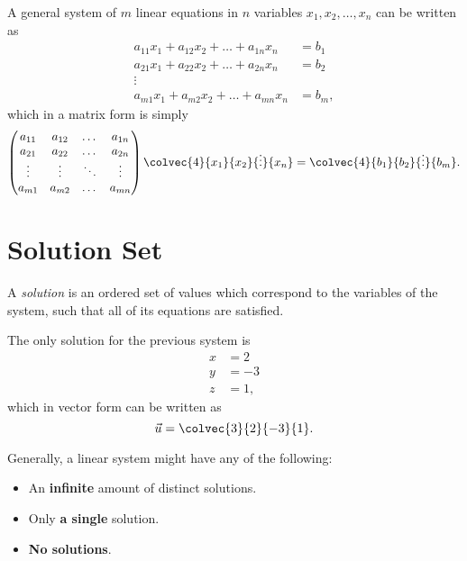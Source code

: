 A general system of $m$ linear equations in $n$ variables $x_{1}, x_{2}, \dots, x_{n}$ can be written as
\begin{align*}
  a_{11}x_{1} + a_{12}x_{2} + \dots + a_{1n}x_{n} &= b_{1}\\
  a_{21}x_{1} + a_{22}x_{2} + \dots + a_{2n}x_{n} &= b_{2}\\
  \vdots\\
  a_{m1}x_{1} + a_{m2}x_{2} + \dots + a_{mn}x_{n} &= b_{m},
\end{align*}
which in a matrix form is simply
\begin{equation*}
  \begin{pmatrix} a_{11} & a_{12} & \dots & a_{1n}\\
          a_{21} & a_{22} & \dots & a_{2n}\\
          \vdots & \vdots & \ddots & \vdots\\
          a_{m1} & a_{m2} & \dots & a_{mn}
  \end{pmatrix}\colvec{4}{x_{1}}{x_{2}}{\vdots}{x_{n}} = \colvec{4}{b_{1}}{b_{2}}{\vdots}{b_{m}}.
\end{equation*}

\section{Solution Set}
A \emph{solution} is an ordered set of values which correspond to the variables of the system, such that all of its equations are satisfied.
\begin{example}
  The only solution for the previous system is
  \begin{align*}
  x &= 2\\
  y &= -3\\
  z &= 1,
  \end{align*}
  which in vector form can be written as
  \begin{equation*}
  \vec{u} = \colvec{3}{2}{-3}{1}.
  \end{equation*}
\end{example}

Generally, a linear system might have any of the following:
\begin{itemize}
  \item An \textbf{infinite} amount of distinct solutions.
  \item Only \textbf{a single} solution. 
  \item \textbf{No solutions}.
\end{itemize}

